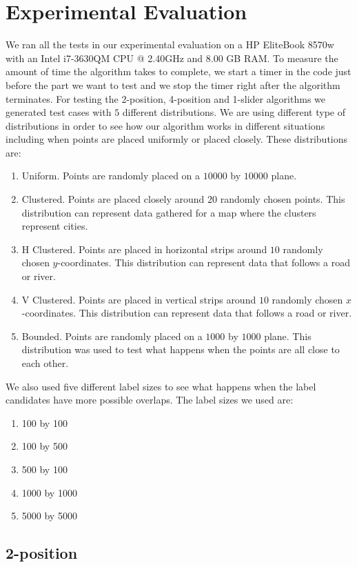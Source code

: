\documentclass[crop=false,a4paper,oneside,11pt]{standalone}
\begin{document}
\section{Experimental Evaluation}

We ran all the tests in our experimental evaluation on a HP EliteBook 8570w with an Intel i7-3630QM CPU @ 2.40GHz and 8.00 GB RAM. To measure the amount of time the algorithm takes to complete, we start a timer in the code just before the part we want to test and we stop the timer right after the algorithm terminates. For testing the 2-position, 4-position and 1-slider algorithms we generated test cases with $5$ different distributions. We are using different type of distributions in order to see how our algorithm works in different situations including when points are placed uniformly or placed closely. These distributions are:
\begin{enumerate}
    \item Uniform. Points are randomly placed on a $10000$ by $10000$ plane.
    \item Clustered. Points are placed closely around $20$ randomly chosen points. This distribution can represent data gathered for a map where the clusters represent cities.
    \item H Clustered. Points are placed in horizontal strips around $10$ randomly chosen $y$-coordinates. This distribution can represent data that follows a road or river.
    \item V Clustered. Points are placed in vertical strips around $10$ randomly chosen $x$-coordinates. This distribution can represent data that follows a road or river.
    \item Bounded. Points are randomly placed on a $1000$ by $1000$ plane. This distribution was used to test what happens when the points are all close to each other.
\end{enumerate}
We also used five different label sizes to see what happens when the label candidates have more possible overlaps. The label sizes we used are:
\begin{enumerate}
    \item 100 by 100
    \item 100 by 500
    \item 500 by 100
    \item 1000 by 1000
    \item 5000 by 5000
\end{enumerate}

\subsection{2-position}
\end{document}
